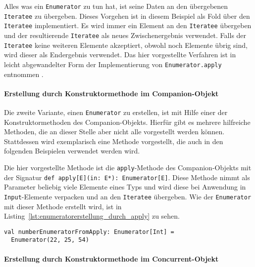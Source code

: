 Alles was ein \lstinline|Enumerator| zu tun hat, ist seine Daten an den übergebenen \lstinline|Iteratee| zu übergeben.
Dieses Vorgehen ist in diesem Beispiel als Fold über den \lstinline|Iteratee| implementiert.
Es wird immer ein Element an den \lstinline|Iteratee| übergeben und der resultierende \lstinline|Iteratee| als neues Zwischenergebnis verwendet.
Falls der \lstinline|Iteratee| keine weiteren Elemente akzeptiert, obwohl noch Elemente übrig sind, wird dieser als Endergebnis verwendet.
Das hier vorgestellte Verfahren ist in leicht abgewandelter Form der Implementierung von \lstinline|Enumerator.apply| entnommen \cite[vgl.][Z.~663 und Z.~690]{play_enumerator_source_code}.


\paragraph{Erstellung durch Konstruktormethode im Companion-Objekt} %
\label{par:erstellung_durch_konstruktormethode_im_companion-object}\mbox{} %

Die zweite Variante, einen \lstinline|Enumerator| zu erstellen, ist mit Hilfe einer der Konstruktormethoden des Companion-Objekts.
Hierfür gibt es mehrere hilfreiche Methoden, die an dieser Stelle aber nicht alle vorgestellt werden können.
Stattdessen wird exemplarisch eine Methode vorgestellt, die auch in den folgenden Beispielen verwendet werden wird.

Die hier vorgestellte Methode ist die \lstinline|apply|-Methode des Companion-Objekts mit der Signatur \lstinline[breaklines=true]|def apply[E](in: E*): Enumerator[E]|.
Diese Methode nimmt als Parameter beliebig viele Elemente eines Typs und wird diese bei Anwendung in \lstinline|Input|-Elemente verpacken und an den \lstinline|Iteratee| übergeben.
Wie der \lstinline|Enumerator| mit dieser Methode erstellt wird, ist in Listing~\ref{lst:enumeratorerstellung_durch_apply} zu sehen.

\begin{lstlisting}[caption=Erstellung eines Enumerators durch die apply-Konstruktormethode, label=lst:enumeratorerstellung_durch_apply]
val numberEnumeratorFromApply: Enumerator[Int] =
  Enumerator(22, 25, 54)
\end{lstlisting}


\paragraph{Erstellung durch Konstruktormethode im Concurrent-Objekt} %
\label{par:erstellung_durch_konstruktormethode_im_concurrent_objekt}\mbox{} %

